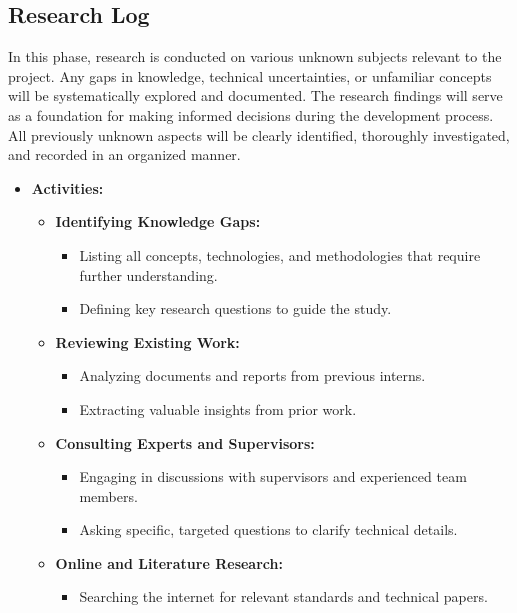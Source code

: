 \documentclass{article}
\begin{document}
\subsection{Research Log}
In this phase, research is conducted on various unknown subjects relevant to the project. Any gaps in knowledge, technical uncertainties, or unfamiliar concepts will be systematically explored and documented. The research findings will serve as a foundation for making informed decisions during the development process. All previously unknown aspects will be clearly identified, thoroughly investigated, and recorded in an organized manner.

\begin{itemize}[leftmargin=*, label={}]
    \item \textbf{Activities:}
    \begin{itemize}
        \item \textbf{Identifying Knowledge Gaps:}
        \begin{itemize}
            \item Listing all concepts, technologies, and methodologies that require further understanding.
            \item Defining key research questions to guide the study.
        \end{itemize}
        \item \textbf{Reviewing Existing Work:}
        \begin{itemize}
            \item Analyzing documents and reports from previous interns.
            \item Extracting valuable insights from prior work.
        \end{itemize}
        \item \textbf{Consulting Experts and Supervisors:}
        \begin{itemize}
            \item Engaging in discussions with supervisors and experienced team members.
            \item Asking specific, targeted questions to clarify technical details.
        \end{itemize}
        \item \textbf{Online and Literature Research:}
        \begin{itemize}
            \item Searching the internet for relevant standards and technical papers. 
        \end{itemize}

\end{itemize}
\end{itemize}
\end{document}
